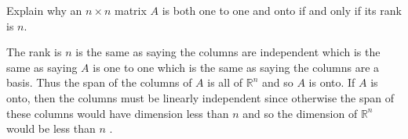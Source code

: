\begin{enumialphparenastyle}
\begin{ex} Explain why an $n\times n$ matrix $A$ is both one to one and onto if
and only if its rank is $n.$ \vspace{1mm}
\begin{sol}
The rank is $n$ is the same as saying the
columns are independent which is the same as saying $A$ is one to one which
is the same as saying the columns are a basis. Thus the span of the columns
of $A$ is all of $\mathbb{R}^{n}$ and so $A$ is onto. If $A$ is onto, then
the columns must be linearly independent since otherwise the span of these
columns would have dimension less than $n$ and so the dimension of $\mathbb{R}^{n}$ would be less than $n$ .
\end{sol}
\end{ex}

\end{enumialphparenastyle}